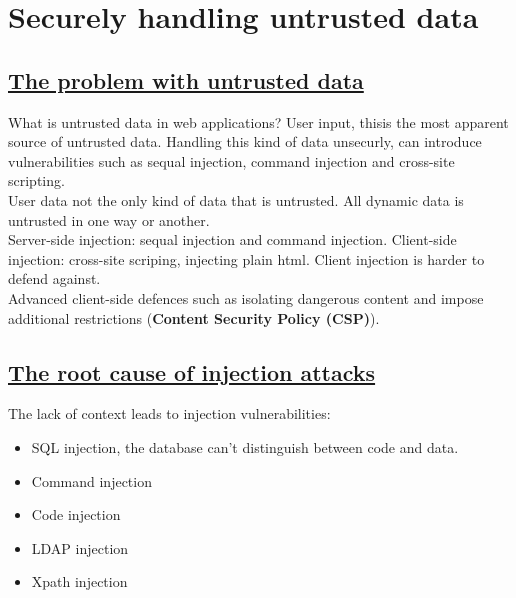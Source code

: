 \documentclass[titlepage]{article}
\begin{document}
    \section{Securely handling untrusted data}
    \subsection{\href{https://youtu.be/vdMyN6NlRyE}{The problem with untrusted data}}
    What is untrusted data in web applications? User input, thisis the most apparent source of untrusted data. Handling this kind of data unsecurly, can introduce vulnerabilities such as sequal injection, command injection and cross-site scripting.\\
    User data not the only kind of data that is untrusted. All dynamic data is untrusted in one way or another.\\
    Server-side injection: sequal injection and command injection. Client-side injection: cross-site scriping, injecting plain html. Client injection is harder to defend against.\\
    Advanced client-side defences such as isolating dangerous content and impose additional restrictions (\textbf{Content Security Policy (CSP)}). 
    \subsection{\href{https://youtu.be/Q5eItFzNc3k}{The root cause of injection attacks}}
    The lack of context leads to injection vulnerabilities:
    \begin{itemize}
        \item SQL injection, the database can't distinguish between code and data.
        \item Command injection
        \item Code injection
        \item LDAP injection
        \item Xpath injection
    \end{itemize}
\end{document}
